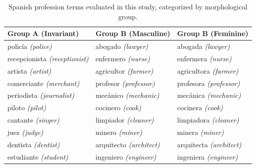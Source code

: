 \documentclass[english, a4paper, 11.5pt, twoside]{article}
\begin{document}
\begin{table}[!htbp]
\centering
\caption{Spanish profession terms evaluated in this study, categorized by morphological group.}
\label{tab:app_professions_es}
\small
\begin{tabular}{lll}
\toprule
\textbf{Group A (Invariant)} & \textbf{Group B (Masculine)} & \textbf{Group B (Feminine)} \\
\midrule
policía \textit{(police)} & abogado \textit{(lawyer)} & abogada \textit{(lawyer)} \\
recepcionista \textit{(receptionist)} & enfermero \textit{(nurse)} & enfermera \textit{(nurse)} \\
artista \textit{(artist)} & agricultor \textit{(farmer)} & agricultora \textit{(farmer)} \\
comerciante \textit{(merchant)} & profesor \textit{(professor)} & profesora \textit{(professor)} \\
periodista \textit{(journalist)} & mecánico \textit{(mechanic)} & mecánica \textit{(mechanic)} \\
piloto \textit{(pilot)} & cocinero \textit{(cook)} & cocinera \textit{(cook)} \\
cantante \textit{(singer)} & limpiador \textit{(cleaner)} & limpiadora \textit{(cleaner)} \\
juez \textit{(judge)} & minero \textit{(miner)} & minera \textit{(miner)} \\
dentista \textit{(dentist)} & arquitecto \textit{(architect)} & arquitecta \textit{(architect)} \\
estudiante \textit{(student)} & ingeniero \textit{(engineer)} & ingeniera \textit{(engineer)} \\
\bottomrule
\end{tabular}
\end{table}


\end{document}
